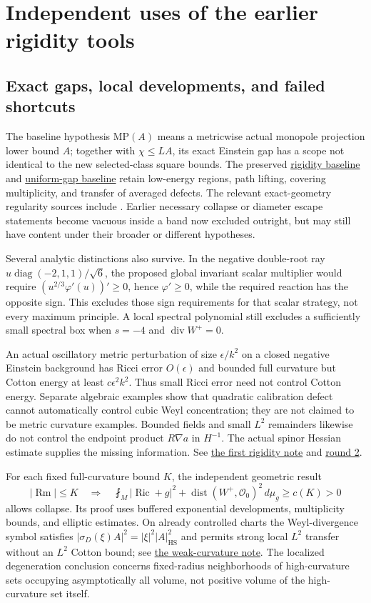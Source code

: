 \documentclass[11pt,a4paper]{article}
\theoremstyle{definition}
\theoremstyle{remark}
\DeclareMathOperator{\Ric}{Ric}
\DeclareMathOperator{\Rm}{Rm}
\DeclareMathOperator{\diver}{div}
\DeclareMathOperator{\dist}{dist}
\newcommand{\dd}{\,d\mu_g}
\newcommand{\avg}[1]{\fint_M #1\dd}
\newcommand{\HS}{\mathrm{HS}}
\newcommand{\roundref}[2]{\href{run:../references/rounds/#1}{#2}}
\newcommand{\baseref}[2]{\href{run:#1}{#2}}
\numberwithin{equation}{section}
\begin{document}
\section{Independent uses of the earlier rigidity tools}\label{sec:legacy}
\subsection{Exact gaps, local developments, and failed shortcuts}\label{sub:legacy-local}
The baseline hypothesis $\mathrm{MP}(A)$ means a metricwise actual
monopole projection lower bound $A$; together with $\chi\le LA$, its
exact Einstein gap has a scope not identical to the new selected-class
square bounds. The preserved
\baseref{20260916_rigidity.tex}{rigidity baseline} and
\baseref{20260916_uniform_gap.tex}{uniform-gap baseline} retain
low-energy regions, path lifting, covering multiplicity, and transfer
of averaged defects. The relevant exact-geometry regularity sources
include \cite{CT,CN,JN}. Earlier necessary collapse or diameter escape
statements become vacuous inside a band now excluded outright, but may
still have content under their broader or different hypotheses.

Several analytic distinctions also survive. In the negative double-root
ray $u\operatorname{diag}(-2,1,1)/\sqrt6$, the proposed global invariant
scalar multiplier would require
$(u^{2/3}\varphi'(u))'\ge0$, hence $\varphi'\ge0$, while the required
reaction has the opposite sign. This excludes those sign requirements
for that scalar strategy, not every maximum principle. A local spectral
polynomial still excludes a sufficiently small spectral box when
$s=-4$ and $\diver W^+=0$.

An actual oscillatory metric perturbation of size $\epsilon/k^2$ on a
closed negative Einstein background has Ricci error $O(\epsilon)$
and bounded full curvature but Cotton energy at least
$c\epsilon^2k^2$. Thus small Ricci error need not control Cotton energy.
Separate algebraic examples show that quadratic calibration defect
cannot automatically control cubic Weyl concentration; they are not
claimed to be metric curvature examples. Bounded fields and small
$L^2$ remainders likewise do not control the endpoint product
$R\nabla a$ in $H^{-1}$. The actual spinor Hessian estimate supplies
the missing information. See \roundref{rigidity.md}{the first rigidity
note} and \roundref{round2_rigidity.md}{round 2}.

For each fixed full-curvature bound $K$, the independent geometric result
\[
 |\Rm|\le K\quad\Longrightarrow\quad
 \avg{|\Ric+g|^2+\dist(W^+,\mathcal O_0)^2}\ge c(K)>0
\]
allows collapse. Its proof uses buffered exponential developments,
multiplicity bounds, and elliptic estimates. On already controlled
charts the Weyl-divergence symbol satisfies
$|\sigma_D(\xi)A|^2=|\xi|^2|A|_{\HS}^2$ and permits strong local
$L^2$ transfer without an $L^2$ Cotton bound; see
\roundref{round2_weak_curvature.md}{the weak-curvature note}.
The localized degeneration conclusion concerns fixed-radius
neighborhoods of high-curvature sets occupying asymptotically all volume,
not positive volume of the high-curvature set itself.
\end{document}
